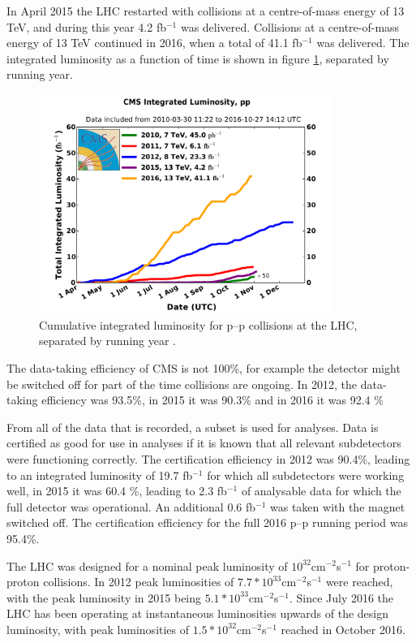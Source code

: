 In April 2015 the \ac{LHC} restarted with collisions at a centre-of-mass energy of 13 TeV, and during 
this year 4.2 fb$^{-1}$ was delivered. Collisions at a centre-of-mass energy of 13 TeV continued
in 2016, when a total of 41.1 fb$^{-1}$ was delivered. 
The integrated luminosity as a function of time is shown in figure \ref{fig:CMSLHC_intlumi},
separated by running year.

\begin{figure}[h!]
\includegraphics[width=0.85\textwidth]{./Detector/Plots/int_lumi_cumulative_pp_2.pdf}
\caption{Cumulative integrated luminosity for p--p collisions at the LHC, separated
by running year \cite{cms-lumi-public}.}
\label{fig:CMSLHC_intlumi}
\end{figure}

The data-taking efficiency of CMS is not 100\%, for example the detector might be
switched off for part of the time collisions are ongoing. In 2012, the data-taking 
efficiency was 93.5\%, in 2015 it was 90.3\% and in 2016 it was 92.4 \%

From all of the data that is recorded, a subset is used for analyses. Data is 
certified as good for use in analyses if it is known that all relevant subdetectors
were functioning correctly. The certification efficiency in 2012 was 90.4\%,
leading to an integrated luminosity of 19.7 fb$^{-1}$ for which all subdetectors
were working well, in 2015 it was 60.4 \%, leading to 2.3 fb$^{-1}$ of analysable data
for which the full detector was operational. An additional 0.6 fb$^{-1}$ was taken
with the magnet switched off. The certification efficiency for the full 2016 p--p running period was 95.4\%.

The \ac{LHC} was designed for a nominal
peak luminosity of $10^{32}$cm$^{-2}$s$^{-1}$ for proton-proton collisions. In 2012 peak
luminosities of $7.7*10^{33}$cm$^{-2}$s$^{-1}$ were reached, with the peak luminosity in
2015 being $5.1*10^{33}$cm$^{-2}$s$^{-1}$. Since July 2016
the \ac{LHC} has been operating at instantaneous luminosities upwards of the 
design luminosity, with peak luminosities of $1.5*10^{32}$cm$^{-2}$s$^{-1}$ reached
in October 2016.

